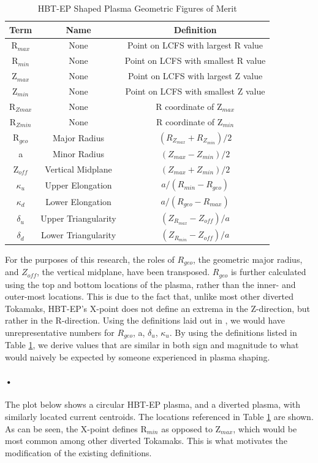 \begin{table}[h!]
\centering
\begin{tabular}{ |c|c|c| } 
\hline
\textbf{Term} & \textbf{Name} & \textbf{Definition} \\ 
\hline
R$_{max}$ & None & Point on LCFS with largest R value \\ 
\hline
R$_{min}$ & None & Point on LCFS with smallest R value \\ 
\hline
Z$_{max}$ & None & Point on LCFS with largest Z value \\ 
\hline
Z$_{min}$ & None & Point on LCFS with smallest Z value \\ 
\hline
R$_{Zmax}$ & None & R coordinate of Z$_{max}$ \\ 
\hline
R$_{Zmin}$ & None & R coordinate of Z$_{min}$  \\ 
\hline
R$_{geo}$ & Major Radius & $(R_{Z_{max}}+R_{Z_{min}})/2$ \\
\hline
a & Minor Radius & $(Z_{max}-Z_{min})/2$ \\ 
\hline
Z$_{off}$ & Vertical Midplane & $(Z_{max}+Z_{min})/2$ \\ 
\hline
$\kappa_u$ & Upper Elongation & $a/(R_{min}-R_{geo})$ \\ 
\hline
$\kappa_d$ & Lower Elongation & $a/(R_{geo}-R_{max})$ \\ 
\hline
$\delta_u$ & Upper Triangularity & $(Z_{R_{max}} - Z_{off})/a$ \\ 
\hline
$\delta_d$ & Lower Triangularity & $(Z_{R_{min}}-Z_{off})/a$ \\ 
\hline
\end{tabular}
\caption{HBT-EP Shaped Plasma Geometric Figures of Merit}
\label{Shaping Deets}
\end{table}

For the purposes of this research, the roles of $R_{geo}$, the geometric major radius, and $Z_{off}$, the vertical midplane, have been transposed.  $R_{geo}$ is further calculated using the top and bottom locations of the plasma, rather than the inner- and outer-most locations.  This is due to the fact that, unlike most other diverted Tokamaks, HBT-EP's X-point does not define an extrema in the Z-direction, but rather in the R-direction.  Using the definitions laid out in \cite{Luce}, we would have unrepresentative numbers for $R_{geo}$, a, $\delta_u$, $\kappa_u$.  By using the definitions listed in Table \ref{Shaping Deets}, we derive values that are similar in both sign and magnitude to what would naively be expected by someone experienced in plasma shaping.\paragraph{•}
The plot below shows a circular HBT-EP plasma, and a diverted plasma, with similarly located current centroids.  The locations referenced in Table \ref{Shaping Deets} are shown.  As can be seen, the X-point defines R$_{min}$ as opposed to Z$_{max}$, which would be most common among other diverted Tokamaks.  This is what motivates the modification of the existing definitions.\paragraph{}


